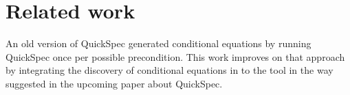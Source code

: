 \section{Related work}
An old version of QuickSpec generated conditional
equations by running QuickSpec once per possible precondition.
This work improves on that approach by integrating the
discovery of conditional equations in to the tool
in the way suggested in the upcoming paper about
QuickSpec.
